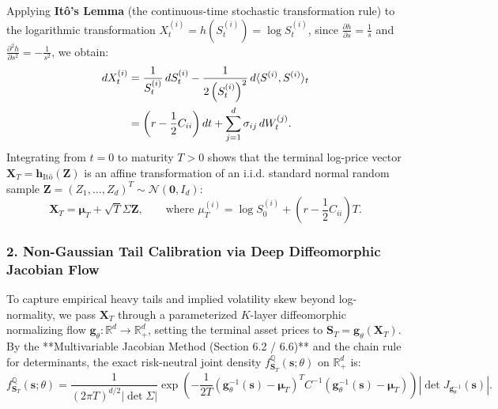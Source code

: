 \documentclass[11pt, letterpaper]{article}
\theoremstyle{definition}
\theoremstyle{remark}
\newcommand{\R}{\mathbb{R}}
\begin{document}
Applying \textbf{It\^o's Lemma} (the continuous-time stochastic transformation rule) to the logarithmic transformation $X_t^{(i)} = h(S_t^{(i)}) = \log S_t^{(i)}$, since $\frac{\partial h}{\partial s} = \frac{1}{s}$ and $\frac{\partial^2 h}{\partial s^2} = -\frac{1}{s^2}$, we obtain:
\begin{align*}
    dX_t^{(i)} &= \frac{1}{S_t^{(i)}} \, dS_t^{(i)} - \frac{1}{2\left(S_t^{(i)}\right)^2} \, d\langle S^{(i)}, S^{(i)} \rangle_t \\ \relax
    &= \left(r - \frac{1}{2} C_{ii}\right) dt + \sum_{j=1}^{d} \sigma_{ij} \, dW_t^{(j)}.
\end{align*}
Integrating from $t = 0$ to maturity $T > 0$ shows that the terminal log-price vector $\mathbf{X}_T = \mathbf{h}_{\text{It\^o}}(\mathbf{Z})$ is an affine transformation of an i.i.d. standard normal random sample $\mathbf{Z} = (Z_1, \dots, Z_d)^T \sim \mathcal{N}(\mathbf{0}, I_d)$:
\[
    \mathbf{X}_T = \boldsymbol{\mu}_T + \sqrt{T} \Sigma \mathbf{Z}, \qquad \text{where } \mu_T^{(i)} = \log S_0^{(i)} + \left(r - \frac{1}{2}C_{ii}\right)T.
\]

\subsubsection*{2. Non-Gaussian Tail Calibration via Deep Diffeomorphic Jacobian Flow}
To capture empirical heavy tails and implied volatility skew beyond log-normality, we pass $\mathbf{X}_T$ through a parameterized $K$-layer diffeomorphic normalizing flow $\mathbf{g}_{\theta} : \R^d \to \R^d_+$, setting the terminal asset prices to $\mathbf{S}_T = \mathbf{g}_{\theta}(\mathbf{X}_T)$. By the **Multivariable Jacobian Method (Section 6.2 / 6.6)** and the chain rule for determinants, the exact risk-neutral joint density $f_{\mathbf{S}_T}^{\mathbb{Q}}(\mathbf{s}; \theta)$ on $\R^d_+$ is:
\[
    f_{\mathbf{S}_T}^{\mathbb{Q}}(\mathbf{s}; \theta) = \frac{1}{(2\pi T)^{d/2} |\det \Sigma|} \exp\left( -\frac{1}{2T} \left(\mathbf{g}_{\theta}^{-1}(\mathbf{s}) - \boldsymbol{\mu}_T\right)^T C^{-1} \left(\mathbf{g}_{\theta}^{-1}(\mathbf{s}) - \boldsymbol{\mu}_T\right) \right) \left|\det J_{\mathbf{g}_{\theta}^{-1}}(\mathbf{s})\right|.
\]
\end{document}
